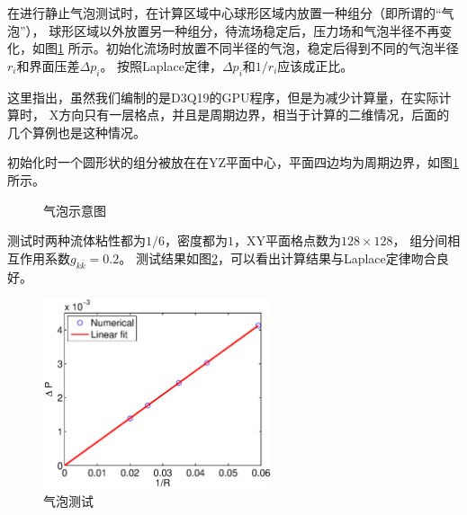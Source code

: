 在进行静止气泡测试时，在计算区域中心球形区域内放置一种组分（即所谓的“气泡”），
球形区域以外放置另一种组分，待流场稳定后，压力场和气泡半径不再变化，如图\ref{fig:bubble}
所示。初始化流场时放置不同半径的气泡，稳定后得到不同的气泡半径$r_i$和界面压差$\Delta p_i$。
按照Laplace定律，$\Delta p_i$和$1/r_i$应该成正比。

这里指出，虽然我们编制的是D3Q19的GPU程序，但是为减少计算量，在实际计算时，
X方向只有一层格点，并且是周期边界，相当于计算的二维情况，后面的几个算例也是这种情况。

初始化时一个圆形状的组分被放在在YZ平面中心，平面四边均为周期边界，如图\ref{fig:bubble}所示。

\begin{figure}[htb]
  \centering
  \caption{气泡示意图}
  \label{fig:bubble}
\end{figure}


测试时两种流体粘性都为$1/6$，密度都为$1$，XY平面格点数为$128\times128$，
组分间相互作用系数$g_{k\bar k}=0.2$。
测试结果如图\ref{fig:bubble_test}，可以看出计算结果与Laplace定律吻合良好。
\begin{figure}[htb]
  \centering
  \includegraphics[width=0.6\textwidth]{img/bubble_test}
  \caption{气泡测试}
  \label{fig:bubble_test}
\end{figure}

